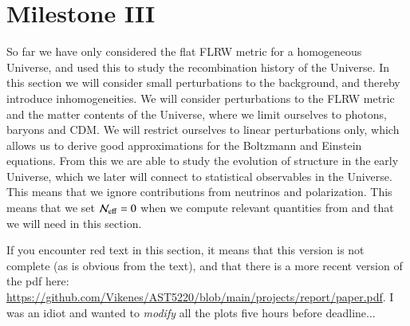 \section{Milestone III}\label{sec:M3}
So far we have only considered the flat FLRW metric for a homogeneous Universe, and used this to study the recombination history of the Universe. In this section we will consider small perturbations to the background, and thereby introduce inhomogeneities. We will consider perturbations to the FLRW metric and the matter contents of the Universe, where we limit ourselves to photons, baryons and CDM. We will restrict ourselves to linear perturbations only, which allows us to derive good approximations for the Boltzmann and Einstein equations. From this we are able to study the evolution of structure in the early Universe, which we later will connect to statistical observables in the Universe. This means that we ignore contributions from neutrinos and polarization. This means that we set $\mathcal{N}_\mathrm{eff}=0$ when we compute relevant quantities from  and  that we will need in this section.    

If you encounter red text in this section, it means that this version is not complete (as is obvious from the text), and that there is a more recent version of the pdf here: \url{https://github.com/Vikenes/AST5220/blob/main/projects/report/paper.pdf}. I was an idiot and wanted to \textit{modify} all the plots five hours before deadline... 






 